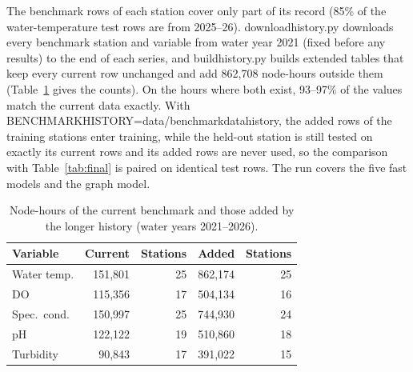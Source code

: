 \documentclass[11pt]{article}
\newcommand{\codeus}{\textunderscore\allowbreak}
\newcommand{\code}[1]{{\ttfamily\let\_\codeus #1}}
\begin{document}
The benchmark rows of each station cover only part of its record (85\% of the water-temperature test
rows are from 2025--26). \code{download\_history.py} downloads every benchmark station and variable
from water year 2021 (fixed before any results) to the end of each series, and
\code{build\_history.py} builds extended tables that keep every current row unchanged and add
862{,}708 node-hours outside them (Table~\ref{tab:historydata} gives the counts). On the hours where
both exist, 93--97\% of the values match the current data exactly. With
\code{BENCHMARK\_HISTORY=data/benchmark\_data\_history}, the added rows of the training stations enter
training, while the held-out station is still tested on exactly its current rows and its added rows
are never used, so the comparison with Table~\ref{tab:final} is paired on identical test rows. The run
covers the five fast models and the graph model.

\begin{table}[h]
\centering
\small
\caption{Node-hours of the current benchmark and those added by the longer history (water years
2021--2026).}
\label{tab:historydata}
\begin{tabular}{l rr rr}
\toprule
Variable & Current & Stations & Added & Stations \\
\midrule
Water temp.   & 151{,}801 & 25 & 862{,}174 & 25 \\
DO            & 115{,}356 & 17 & 504{,}134 & 16 \\
Spec.\ cond.  & 150{,}997 & 25 & 744{,}930 & 24 \\
pH            & 122{,}122 & 19 & 510{,}860 & 18 \\
Turbidity     &  90{,}843 & 17 & 391{,}022 & 15 \\
\bottomrule
\end{tabular}
\end{table}
\end{document}
